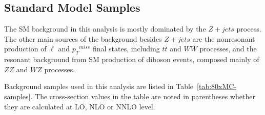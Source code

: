 \subsection{Standard Model Samples}
The SM background in this analysis is mostly dominated by the $Z+jets$ process. The other main sources of the background besides $Z+jets$ are the nonresonant production of $\ell$ and ${p_{T}}^{miss}$ final states, including $t\bar{t}$ and $WW$ processes, and the resonant background from SM production of diboson events, composed mainly of $ZZ$ and $WZ$ processes. 

\vspace{0.3cm}
Background samples used in this analysis are listed in Table~\ref{tab:80xMC-samples}.
The cross-section values in the table are noted in parentheses whether they are
calculated at LO, NLO or NNLO level.

